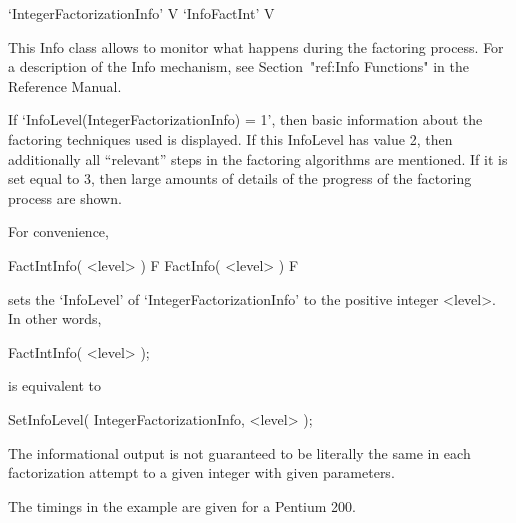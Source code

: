 

\>`IntegerFactorizationInfo' V
\>`InfoFactInt' V

This Info class allows to monitor what happens during the factoring
process. For a description of the Info mechanism, see
Section~"ref:Info Functions" in the {\GAP} Reference Manual.

If `InfoLevel(IntegerFactorizationInfo) = 1', then basic information
about the factoring techniques used is displayed. If this InfoLevel has
value 2, then additionally all ``relevant'' steps in the factoring
algorithms are mentioned. If it is set equal to 3, then large amounts
of details of the progress of the factoring process are shown. 

For convenience,

\>FactIntInfo( <level> ) F
\>FactInfo( <level> ) F

sets the `InfoLevel' of `IntegerFactorizationInfo' to the positive integer
<level>. In other words,

FactIntInfo( <level> );

is equivalent to

SetInfoLevel( IntegerFactorizationInfo, <level> );

The informational output is not guaranteed to be literally the same in
each factorization attempt to a given integer with given parameters.

The timings in the example are given for a Pentium 200.

